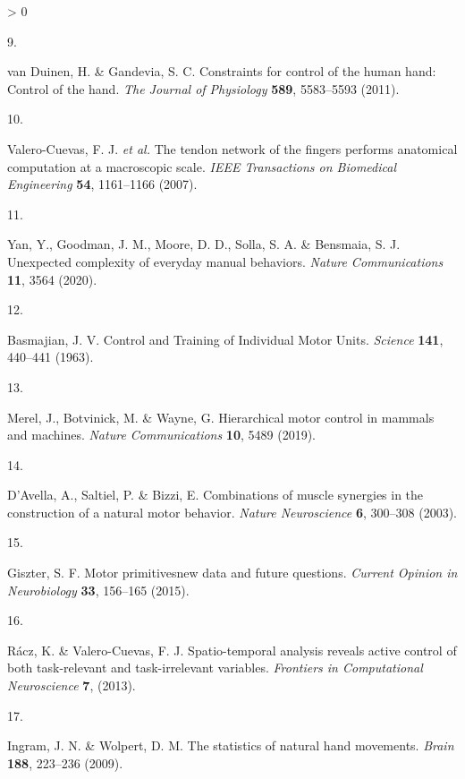 \documentclass[
  a4paper,
]{article}
\newlength{\cslhangindent}
\newlength{\csllabelwidth}
\newenvironment{CSLReferences}[2] %
 {%
  \setlength{\parindent}{0pt}
  \ifodd #1 \everypar{\setlength{\hangindent}{\cslhangindent}}\ignorespaces\fi
  \ifnum #2 > 0
  \setlength{\parskip}{#2\baselineskip}
  \fi
 }%
 {}
\newcommand{\CSLLeftMargin}[1]{\parbox[t]{\csllabelwidth}{#1}}
\newcommand{\CSLRightInline}[1]{\parbox[t]{\linewidth - \csllabelwidth}{#1}\break}
\begin{document}
\begin{CSLReferences}{0}{0}
\leavevmode\hypertarget{ref-vanduinenConstraintsControlHuman2011}{}%
\CSLLeftMargin{9. }
\CSLRightInline{van Duinen, H. \& Gandevia, S. C. Constraints for
control of the human hand: {Control} of the hand. \emph{The Journal of
Physiology} \textbf{589}, 5583--5593 (2011).}

\leavevmode\hypertarget{ref-Valero-Cuevas2007}{}%
\CSLLeftMargin{10. }
\CSLRightInline{Valero-Cuevas, F. J. \emph{et al.} The tendon network of
the fingers performs anatomical computation at a macroscopic scale.
\emph{IEEE Transactions on Biomedical Engineering} \textbf{54},
1161--1166 (2007).}

\leavevmode\hypertarget{ref-yanUnexpectedComplexityEveryday2020}{}%
\CSLLeftMargin{11. }
\CSLRightInline{Yan, Y., Goodman, J. M., Moore, D. D., Solla, S. A. \&
Bensmaia, S. J. Unexpected complexity of everyday manual behaviors.
\emph{Nature Communications} \textbf{11}, 3564 (2020).}

\leavevmode\hypertarget{ref-Basmajian1963}{}%
\CSLLeftMargin{12. }
\CSLRightInline{Basmajian, J. V. Control and {Training} of {Individual
Motor Units}. \emph{Science} \textbf{141}, 440--441 (1963).}

\leavevmode\hypertarget{ref-merelHierarchicalMotorControl2019}{}%
\CSLLeftMargin{13. }
\CSLRightInline{Merel, J., Botvinick, M. \& Wayne, G. Hierarchical motor
control in mammals and machines. \emph{Nature Communications}
\textbf{10}, 5489 (2019).}

\leavevmode\hypertarget{ref-DAvella2003}{}%
\CSLLeftMargin{14. }
\CSLRightInline{D'Avella, A., Saltiel, P. \& Bizzi, E. Combinations of
muscle synergies in the construction of a natural motor behavior.
\emph{Nature Neuroscience} \textbf{6}, 300--308 (2003).}

\leavevmode\hypertarget{ref-giszterMotorPrimitivesNew2015}{}%
\CSLLeftMargin{15. }
\CSLRightInline{Giszter, S. F. Motor primitives{}new data and future
questions. \emph{Current Opinion in Neurobiology} \textbf{33}, 156--165
(2015).}

\leavevmode\hypertarget{ref-raczSpatiotemporalAnalysisReveals2013}{}%
\CSLLeftMargin{16. }
\CSLRightInline{Rácz, K. \& Valero-Cuevas, F. J. Spatio-temporal
analysis reveals active control of both task-relevant and
task-irrelevant variables. \emph{Frontiers in Computational
Neuroscience} \textbf{7}, (2013).}

\leavevmode\hypertarget{ref-Ingram2009}{}%
\CSLLeftMargin{17. }
\CSLRightInline{Ingram, J. N. \& Wolpert, D. M. The statistics of
natural hand movements. \emph{Brain} \textbf{188}, 223--236 (2009).}


\end{CSLReferences}
\end{document}
